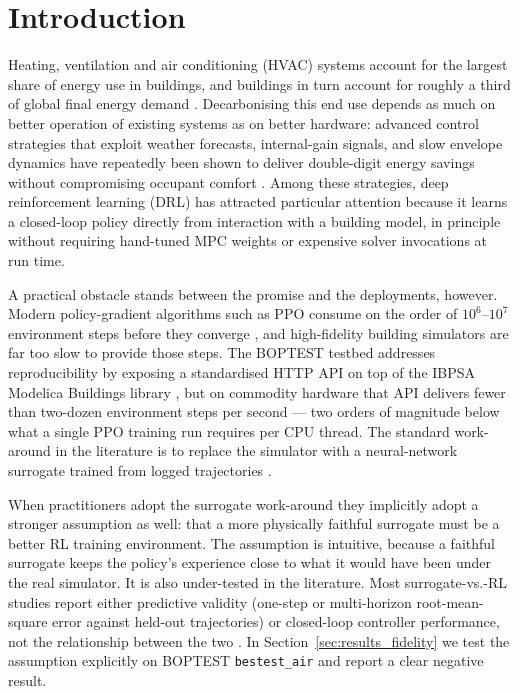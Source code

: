 \section{Introduction}
\label{sec:introduction}

Heating, ventilation and air conditioning (HVAC) systems account for the
largest share of energy use in buildings, and buildings in turn account
for roughly a third of global final energy demand
\citep{Perez2008BuildingShare,IEA2024Buildings}. Decarbonising this end
use depends as much on better operation of existing systems as on
better hardware: advanced control strategies that exploit weather
forecasts, internal-gain signals, and slow envelope dynamics have
repeatedly been shown to deliver double-digit energy savings without
compromising occupant comfort
\citep{Drgona2020StochasticMPC,Mason2019RLReview}. Among these
strategies, deep reinforcement learning (DRL) has attracted particular
attention because it learns a closed-loop policy directly from
interaction with a building model, in principle without requiring
hand-tuned MPC weights or expensive solver invocations at run time.

A practical obstacle stands between the promise and the deployments,
however. Modern policy-gradient algorithms such as PPO consume on the
order of $10^{6}$--$10^{7}$ environment steps before they converge
\citep{Schulman2017PPO,Henderson2018Reproducibility}, and high-fidelity
building simulators are far too slow to provide those steps. The
BOPTEST testbed \citep{Blum2021BOPTEST}
addresses reproducibility by exposing a standardised HTTP API on top of
the IBPSA Modelica Buildings library \citep{Wetter2014Modelica}, but
on commodity hardware that API delivers fewer than two-dozen
environment steps per second --- two orders of magnitude below what a
single PPO training run requires per CPU thread. The standard
work-around in the literature is to replace the simulator with a
neural-network surrogate trained from logged trajectories
\citep{Zhang2019WholeBuilding,Amasyali2018Review,Kazmi2019DataDriven}.

When practitioners adopt the surrogate work-around they implicitly
adopt a stronger assumption as well: that a more physically faithful
surrogate must be a better RL training environment. The assumption is
intuitive, because a faithful surrogate keeps the policy's experience
close to what it would have been under the real simulator. It is also
under-tested in the literature. Most surrogate-vs.-RL studies report
either predictive validity (one-step or multi-horizon root-mean-square
error against held-out trajectories) or closed-loop controller
performance, not the relationship between the two
\citep{HouEvins2024,Bacher2011RCIdentification}. In
Section~\ref{sec:results_fidelity} we test the assumption explicitly
on BOPTEST \texttt{bestest\_air} and report a clear negative result.

